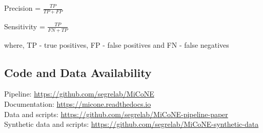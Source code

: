   Precision = $\frac{TP}{TP + FP}$

  Sensitivity = $\frac{TP}{FN + TP}$

  where, TP - true positives, FP - false positives and FN - false negatives

  \subsection*{Code and Data Availability}
  Pipeline: \href{https://github.com/segrelab/MiCoNE}{https://github.com/segrelab/MiCoNE} \\
  Documentation: \href{https://micone.readthedocs.io}{https://micone.readthedocs.io} \\
  Data and scripts: \href{https://github.com/segrelab/MiCoNE-pipeline-paper}{https://github.com/segrelab/MiCoNE-pipeline-paper} \\
  Synthetic data and scripts: \href{https://github.com/segrelab/MiCoNE-synthetic-data}{https://github.com/segrelab/MiCoNE-synthetic-data}

